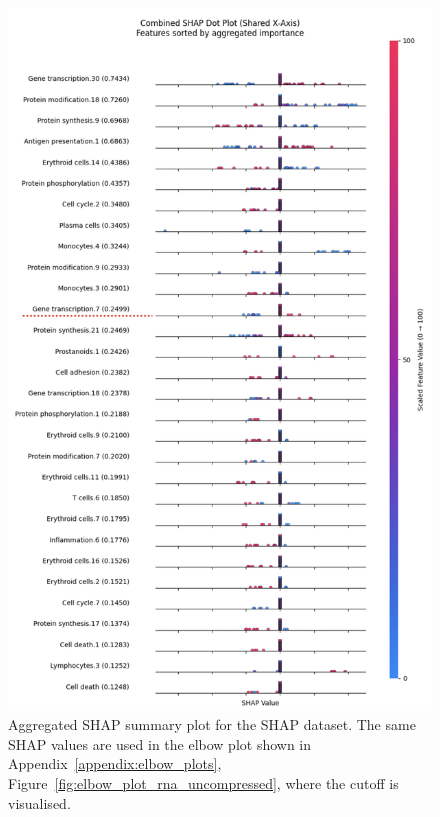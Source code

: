 \documentclass[12pt,a4paper]{report}
\begin{document}
\begin{figure}[h!]
    \centering
    \includegraphics[width=0.85\linewidth]{images/Aggregated_SHAP_RNA_uncompressed.png}
    \caption[Aggregated SHAP plot for SHAP]{Aggregated SHAP summary plot for the SHAP dataset. The same SHAP values are used in the elbow plot shown in Appendix~\ref{appendix:elbow_plots}, Figure~\ref{fig:elbow_plot_rna_uncompressed}, where the cutoff is visualised.}
    \label{fig:rna_aggregated_shap}
\end{figure}
\end{document}
